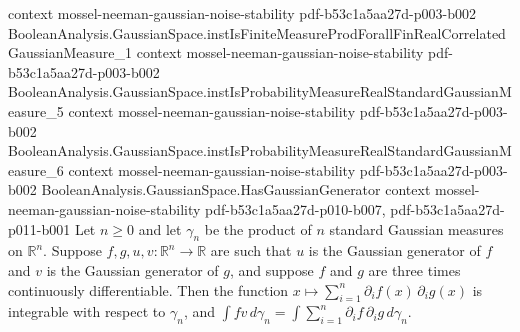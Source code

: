 \begin{theorem}
  {context}
  {mossel-neeman-gaussian-noise-stability}
  {pdf-b53c1a5aa27d-p003-b002}
\proofstep
  {BooleanAnalysis.GaussianSpace.instIsFiniteMeasureProdForallFinRealCorrelatedGaussianMeasure_1}
  {context}
  {mossel-neeman-gaussian-noise-stability}
  {pdf-b53c1a5aa27d-p003-b002}
\proofstep
  {BooleanAnalysis.GaussianSpace.instIsProbabilityMeasureRealStandardGaussianMeasure_5}
  {context}
  {mossel-neeman-gaussian-noise-stability}
  {pdf-b53c1a5aa27d-p003-b002}
\proofstep
  {BooleanAnalysis.GaussianSpace.instIsProbabilityMeasureRealStandardGaussianMeasure_6}
  {context}
  {mossel-neeman-gaussian-noise-stability}
  {pdf-b53c1a5aa27d-p003-b002}
\proofstep
  {BooleanAnalysis.GaussianSpace.HasGaussianGenerator}
  {context}
  {mossel-neeman-gaussian-noise-stability}
  {pdf-b53c1a5aa27d-p010-b007,
    pdf-b53c1a5aa27d-p011-b001}
Let $n\ge0$ and let $\gamma_n$ be the product of $n$ standard Gaussian measures on
$\mathbb R^n$. Suppose $f,g,u,v:\mathbb R^n\to\mathbb R$ are such that $u$ is the
Gaussian generator of $f$ and $v$ is the Gaussian generator of $g$, and suppose $f$ and
$g$ are three times continuously differentiable. Then the function $x\mapsto\sum_{i=1}^n
\partial_i f(x)\,\partial_i g(x)$ is integrable with respect to $\gamma_n$, and $\int f
v\,d\gamma_n=\int\sum_{i=1}^n\partial_i f\,\partial_i g\,d\gamma_n$.
\end{theorem}

